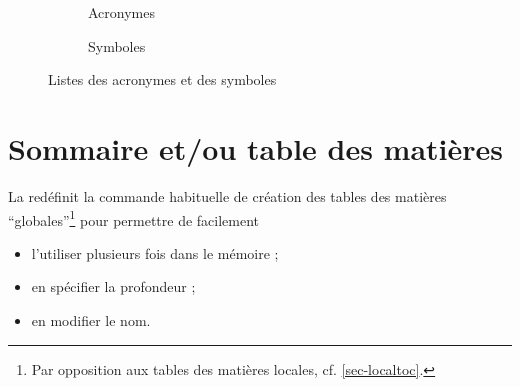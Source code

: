 \begin{landscape}
  \begin{figure}[p]
    \centering
    \begin{subfigure}[b]{.45\linewidth}
      \centering
      \caption{Acronymes}
      \label{fig-printacronyms}
    \end{subfigure}%
    \begin{subfigure}[b]{.45\linewidth}
      \centering
      \caption{Symboles}
      \label{fig-printsymbols}
    \end{subfigure}%
    \caption{Listes des acronymes et des symboles}
    \label{fig-printacronyms-printsymbols}
  \end{figure}
\end{landscape}


\section{Sommaire et/ou table des matières}\label{sec-table-des-matieres}

La \yatCl{} redéfinit la commande  habituelle de
création des tables des matières \enquote{globales}\footnote{Par opposition aux
  tables des matières locales,
  cf. \vref{sec-localtoc}.} pour permettre de facilement
\begin{itemize}
\item l'utiliser plusieurs fois dans le mémoire ;
\item en spécifier la profondeur ;
\item en modifier le nom.
\end{itemize}

